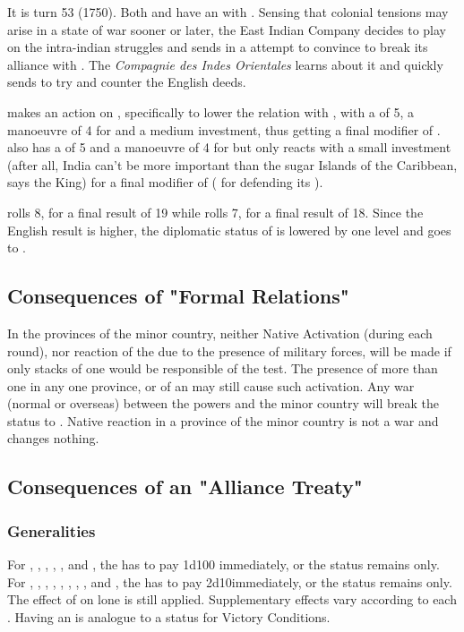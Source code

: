 \begin{exemple}
  It is turn 53 (1750). Both \FRA and \ANG have an \dipAT with
  \paysMysore. Sensing that colonial tensions may arise in a state of
  war sooner or later, the East Indian Company decides to play on the
  intra-indian struggles and sends \leaderClive in a attempt to convince
  \paysMysore to break its alliance with \FRA. The \emph{Compagnie des
    Indes Orientales} learns about it and quickly sends \leaderDupleix
  to try and counter the English deeds.

  \ANG makes an action on \paysMysore, specifically to lower the
  relation with \FRA, with a \FTI of 5, a manoeuvre of 4 for
  \leaderClive and a medium investment, thus getting a final modifier of
  . \FRA also has a \FTI of 5 and a manoeuvre of 4 for
  \leaderDupleix but only reacts with a small investment (after all,
  India can't be more important than the sugar Islands of the Caribbean,
  says the King) for a final modifier of  ( for
  defending its \dipAT).

  \ANG rolls 8, for a final result of 19 while \FRA rolls 7, for a final
  result of 18. Since the English result is higher, the diplomatic
  status of \FRA is lowered by one level and goes to \dipFR.
\end{exemple}

\subsection{Consequences of "Formal Relations"}
\aparag In the provinces of the minor country, neither Native Activation
(during each round), nor reaction of the \MIN due to the presence of
military forces, will be made if only stacks of one \LD would be
responsible of the test.
\bparag The presence of more than one \LD in any one province, or of an
\ARMY may still cause such activation.
\aparag Any war (normal or overseas) between the powers and the minor
country will break the status to \dipNR. Native reaction in a province
of the minor country is not a war and changes nothing.

\subsection{Consequences of an "Alliance Treaty"}
\subsubsection{Generalities}
\aparag For \paysInca, \paysAzteque, \paysGujarat, \paysMogol,
\paysChine, \paysJapon and \paysAfghans, the \MAJ has to pay 1d100
\ducats immediately, or the status remains \dipFR only.
\aparag For \paysVijayanagar, \paysSiberie, \paysOman, \paysAden,
\paysSoudan, \paysMysore, \paysHyderabad, \paysIroquois, and \paysOrmus,
the \MAJ has to pay 2d10\ducats immediately, or the status remains
\dipFR only.
\aparag The effect of \dipFR on lone \LD is still applied.
\aparag
Supplementary effects vary according to each \MIN.
\aparag Having an \dipAT is analogue to a \VASSAL status for Victory
Conditions.

